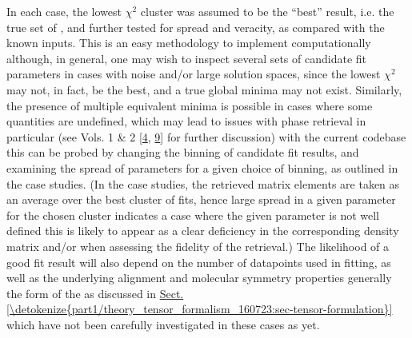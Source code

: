 \documentclass[letterpaper,table,10pt,english]{jupyterBook}
\begin{document}
\sphinxAtStartPar
In each case, the lowest \(\chi^2\) cluster was assumed to be the “best” result, i.e. the true set of {\hyperref[\detokenize{backmatter/glossary:term-radial-matrix-elements}]{}}, and further tested for spread and veracity, as compared with the known inputs. This is an easy methodology to implement computationally although, in general, one may wish to inspect several sets of candidate fit parameters in cases with noise and/or large solution spaces, since the lowest \(\chi^2\) may not, in fact, be the best, and a true global minima may not exist. Similarly, the presence of multiple equivalent minima is possible in cases where some quantities are undefined, which may lead to issues with phase retrieval in particular (see  Vols. 1 \& 2 {[}\hyperlink{cite.backmatter/bibliography:id676}{4}, \hyperlink{cite.backmatter/bibliography:id677}{9}{]} for further discussion) \sphinxhyphen{} with the current codebase this can be probed by changing the binning of candidate fit results, and examining the spread of parameters for a given choice of binning, as outlined in the case studies. (In the case studies, the retrieved matrix elements are taken as an average over the best cluster of fits, hence large spread in a given parameter for the chosen cluster indicates a case where the given parameter is not well defined \sphinxhyphen{} this is likely to appear as a clear deficiency in the corresponding density matrix and/or {\hyperref[\detokenize{backmatter/glossary:term-MF}]{}} when assessing the fidelity of the retrieval.) The likelihood of a good fit result will also depend on the number of data\sphinxhyphen{}points used in fitting, as well as the underlying alignment and molecular symmetry properties \sphinxhyphen{} generally the form of the {\hyperref[\detokenize{backmatter/glossary:term-channel-functions}]{}} as discussed in \hyperref[\detokenize{part1/theory_tensor_formalism_160723:sec-tensor-formulation}]{Sect.\@ \ref{\detokenize{part1/theory_tensor_formalism_160723:sec-tensor-formulation}}} \sphinxhyphen{} which have not been carefully investigated in these cases as yet.
\end{document}
